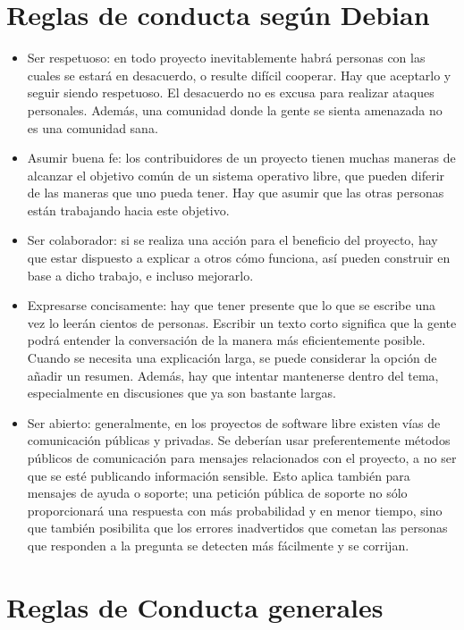 \section{Reglas de conducta según Debian}
\begin{itemize}
	\item Ser respetuoso: en todo proyecto inevitablemente habrá personas con las cuales se estará en desacuerdo, o resulte difícil cooperar. Hay que aceptarlo y seguir siendo respetuoso. El desacuerdo no es excusa para realizar ataques personales. Además, una comunidad donde la gente se sienta amenazada no es una comunidad sana.
	\item Asumir buena fe: los contribuidores de un proyecto tienen muchas maneras de alcanzar el objetivo común de un sistema operativo libre, que pueden diferir de las maneras que uno pueda tener. Hay que asumir que las otras personas están trabajando hacia este objetivo.
	\item Ser colaborador: si se realiza una acción para el beneficio del proyecto, hay que estar dispuesto a explicar a otros cómo funciona, así pueden construir en base a dicho trabajo, e incluso mejorarlo.
	\item Expresarse concisamente: hay que tener presente que lo que se escribe una vez lo leerán cientos de personas. Escribir un texto corto significa que la gente podrá entender la conversación de la manera más eficientemente posible. Cuando se necesita una explicación larga, se puede considerar la opción de añadir un resumen. Además, hay que intentar mantenerse dentro del tema, especialmente en discusiones que ya son bastante largas.
	\item Ser abierto: generalmente, en los proyectos de software libre existen vías de comunicación públicas y privadas. Se deberían usar preferentemente métodos públicos de comunicación para mensajes relacionados con el proyecto, a no ser que se esté publicando información sensible.
Esto aplica también para mensajes de ayuda o soporte; una petición pública de soporte no sólo proporcionará una respuesta con más probabilidad y en menor tiempo, sino que también posibilita que los errores inadvertidos que cometan las personas que responden a la pregunta se detecten más fácilmente y se corrijan.
\end{itemize}

\section{Reglas de Conducta generales}

